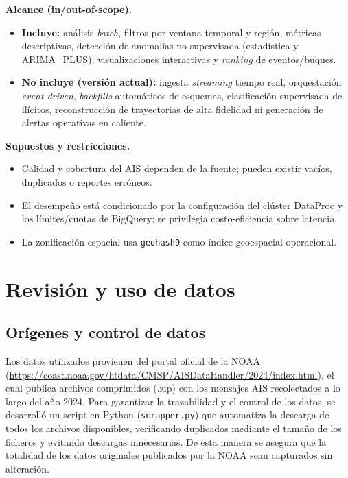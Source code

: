 \documentclass[10pt]{article}
\begin{document}
\vspace{0.2cm}
\newpage
\noindent\textbf{Alcance (in/out-of-scope).}
\begin{itemize}
  \item \textbf{Incluye:} análisis \textit{batch}, filtros por ventana temporal y región, métricas descriptivas, detección de anomalías no supervisada (estadística y ARIMA\_PLUS), visualizaciones interactivas y \textit{ranking} de eventos/buques.
  \item \textbf{No incluye (versión actual):} ingesta \textit{streaming} tiempo real, orquestación \textit{event-driven}, \textit{backfills} automáticos de esquemas, clasificación supervisada de ilícitos, reconstrucción de trayectorias de alta fidelidad ni generación de alertas operativas en caliente.
\end{itemize}

\vspace{0.2cm}
\noindent\textbf{Supuestos y restricciones.}
\begin{itemize}
  \item Calidad y cobertura del AIS dependen de la fuente; pueden existir vacíos, duplicados o reportes erróneos.
  \item El desempeño está condicionado por la configuración del clúster DataProc y los límites/cuotas de BigQuery; se privilegia costo-eficiencia sobre latencia.
  \item La zonificación espacial usa \texttt{geohash9} como índice geoespacial operacional.
\end{itemize}

\section{Revisión y uso de datos}
\subsection{Orígenes y control de datos}

Los datos utilizados provienen del portal oficial de la NOAA (\url{https://coast.noaa.gov/htdata/CMSP/AISDataHandler/2024/index.html}), el cual publica archivos comprimidos (.zip) con los mensajes AIS recolectados a lo largo del año 2024. 
Para garantizar la trazabilidad y el control de los datos, se desarrolló un script en Python (\texttt{scrapper.py}) que automatiza la descarga de todos los archivos disponibles, verificando duplicados mediante el tamaño de los ficheros y evitando descargas innecesarias. 
De esta manera se asegura que la totalidad de los datos originales publicados por la NOAA sean capturados sin alteración.
\end{document}
